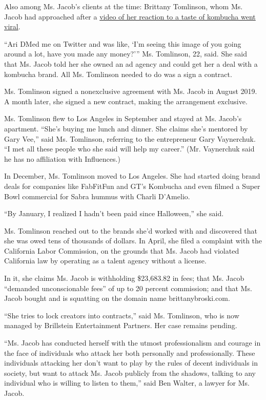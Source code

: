 Also among Ms. Jacob's clients at the time: Brittany Tomlinson, whom Ms.
Jacob had approached after a
\href{https://www.nytimes3xbfgragh.onion/2019/08/20/style/kombucha-internet-viral.html}{video
of her reaction to a taste of kombucha went viral}.

``Ari DMed me on Twitter and was like, `I'm seeing this image of you
going around a lot, have you made any money?''' Ms. Tomlinson, 22, said.
She said that Ms. Jacob told her she owned an ad agency and could get
her a deal with a kombucha brand. All Ms. Tomlinson needed to do was a
sign a contract.

Ms. Tomlinson signed a nonexclusive agreement with Ms. Jacob in August
2019. A month later, she signed a new contract, making the arrangement
exclusive.

Ms. Tomlinson flew to Los Angeles in September and stayed at Ms. Jacob's
apartment. ``She's buying me lunch and dinner. She claims she's mentored
by Gary Vee,'' said Ms. Tomlinson, referring to the entrepreneur Gary
Vaynerchuk. ``I met all these people who she said will help my career.''
(Mr. Vaynerchuk said he has no affiliation with Influences.)

In December, Ms. Tomlinson moved to Los Angeles. She had started doing
brand deals for companies like FabFitFun and GT's Kombucha and even
filmed a Super Bowl commercial for Sabra hummus with Charli D'Amelio.

``By January, I realized I hadn't been paid since Halloween,'' she said.

Ms. Tomlinson reached out to the brands she'd worked with and discovered
that she was owed tens of thousands of dollars. In April, she filed a
complaint with the California Labor Commission, on the grounds that Ms.
Jacob had violated California law by operating as a talent agency
without a license.

In it, she claims Ms. Jacob is withholding \$23,683.82 in fees; that Ms.
Jacob ``demanded unconscionable fees'' of up to 20 percent commission;
and that Ms. Jacob bought and is squatting on the domain name
brittanybroski.com.

``She tries to lock creators into contracts,'' said Ms. Tomlinson, who
is now managed by Brillstein Entertainment Partners. Her case remains
pending.

``Ms. Jacob has conducted herself with the utmost professionalism and
courage in the face of individuals who attack her both personally and
professionally. These individuals attacking her don't want to play by
the rules of decent individuals in society, but want to attack Ms. Jacob
publicly from the shadows, talking to any individual who is willing to
listen to them,'' said Ben Walter, a lawyer for Ms. Jacob.

